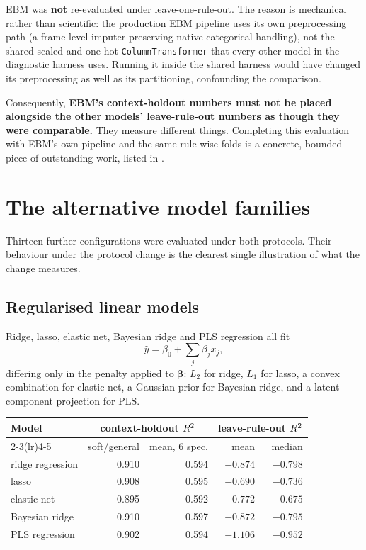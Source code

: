 \begin{limitbox}[title=Stated gap in the revised evaluation]
EBM was \textbf{not} re-evaluated under leave-one-rule-out. The reason is
mechanical rather than scientific: the production EBM pipeline uses its own
preprocessing path (a frame-level imputer preserving native categorical
handling), not the shared scaled-and-one-hot \texttt{ColumnTransformer}
that every other model in the diagnostic harness uses. Running it inside
the shared harness would have changed its preprocessing as well as its
partitioning, confounding the comparison.

Consequently, \textbf{EBM's context-holdout numbers must not be placed
alongside the other models' leave-rule-out numbers as though they were
comparable.} They measure different things. Completing this evaluation
with EBM's own pipeline and the same rule-wise folds is a concrete,
bounded piece of outstanding work, listed in .
\end{limitbox}

\section{The alternative model families}

Thirteen further configurations were evaluated under both protocols. Their
behaviour under the protocol change is the clearest single illustration of
what the change measures.

\subsection{Regularised linear models}

Ridge, lasso, elastic net, Bayesian ridge and PLS regression all fit
\begin{equation}
\hat{y} = \beta_0 + \sum_{j} \beta_j x_j,
\end{equation}
differing only in the penalty applied to $\boldsymbol{\beta}$: $L_2$ for
ridge, $L_1$ for lasso, a convex combination for elastic net, a Gaussian
prior for Bayesian ridge, and a latent-component projection for PLS.

\begin{center}\small
\begin{tabular}{lrrrr}
\toprule
Model & \multicolumn{2}{c}{context-holdout $R^2$} & \multicolumn{2}{c}{leave-rule-out $R^2$} \\
\cmidrule(lr){2-3}\cmidrule(lr){4-5}
 & soft/general & mean, 6 spec. & mean & median \\
\midrule
ridge regression & 0.910 & 0.594 & $-0.874$ & $-0.798$ \\
lasso & 0.908 & 0.595 & $-0.690$ & $-0.736$ \\
elastic net & 0.895 & 0.592 & $-0.772$ & $-0.675$ \\
Bayesian ridge & 0.910 & 0.597 & $-0.872$ & $-0.795$ \\
PLS regression & 0.902 & 0.594 & $-1.106$ & $-0.952$ \\
\bottomrule
\end{tabular}
\end{center}

